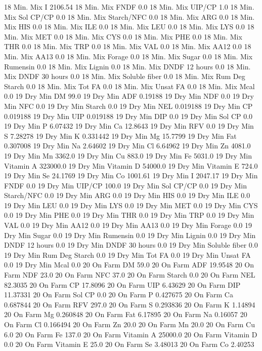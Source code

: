 \documentclass[letterpaper,10pt,english]{sphinxmanual}
\begin{document}
\begin{sphinxVerbatim}[commandchars=\\\{\},numbers=left,firstnumber=1,stepnumber=1]
18 Min. Mix I 2106.54
18 Min. Mix FNDF 0.0
18 Min. Mix UIP/CP 1.0
18 Min. Mix Sol CP/CP 0.0
18 Min. Mix Starch/NFC 0.0
18 Min. Mix ARG 0.0
18 Min. Mix HIS 0.0
18 Min. Mix ILE 0.0
18 Min. Mix LEU 0.0
18 Min. Mix LYS 0.0
18 Min. Mix MET 0.0
18 Min. Mix CYS 0.0
18 Min. Mix PHE 0.0
18 Min. Mix THR 0.0
18 Min. Mix TRP 0.0
18 Min. Mix VAL 0.0
18 Min. Mix AA\PYGZsh{}12 0.0
18 Min. Mix AA\PYGZsh{}13 0.0
18 Min. Mix \PYGZpc{} Forage 0.0
18 Min. Mix Sugar \PYGZpc{} 0.0
18 Min. Mix Rumensin 0.0
18 Min. Mix Lignin 0.0
18 Min. Mix DNDF 12 hours 0.0
18 Min. Mix DNDF 30 hours 0.0
18 Min. Mix Soluble fiber 0.0
18 Min. Mix Rum Deg Starch 0.0
18 Min. Mix Tot FA 0.0
18 Min. Mix Unsat FA 0.0
18 Min. Mix Mcal 0.0
19 Dry Min DM 99.0
19 Dry Min ADF 0.19188
19 Dry Min NDF 0.0
19 Dry Min NFC 0.0
19 Dry Min Starch 0.0
19 Dry Min NEL 0.019188
19 Dry Min CP 0.019188
19 Dry Min UIP 0.019188
19 Dry Min DIP 0.0
19 Dry Min Sol CP 0.0
19 Dry Min P 6.07432
19 Dry Min Ca 12.8643
19 Dry Min RFV 0.0
19 Dry Min S 7.28278
19 Dry Min K 0.331442
19 Dry Min Mg 15.7799
19 Dry Min Fat 0.307008
19 Dry Min Na 2.64602
19 Dry Min Cl 6.64962
19 Dry Min Zn 4081.0
19 Dry Min Mn 3362.0
19 Dry Min Cu 883.0
19 Dry Min Fe 5031.0
19 Dry Min Vitamin A 323000.0
19 Dry Min Vitamin D 54000.0
19 Dry Min Vitamin E 724.0
19 Dry Min Se 24.1769
19 Dry Min Co 1001.61
19 Dry Min I 2047.17
19 Dry Min FNDF 0.0
19 Dry Min UIP/CP 100.0
19 Dry Min Sol CP/CP 0.0
19 Dry Min Starch/NFC 0.0
19 Dry Min ARG 0.0
19 Dry Min HIS 0.0
19 Dry Min ILE 0.0
19 Dry Min LEU 0.0
19 Dry Min LYS 0.0
19 Dry Min MET 0.0
19 Dry Min CYS 0.0
19 Dry Min PHE 0.0
19 Dry Min THR 0.0
19 Dry Min TRP 0.0
19 Dry Min VAL 0.0
19 Dry Min AA\PYGZsh{}12 0.0
19 Dry Min AA\PYGZsh{}13 0.0
19 Dry Min \PYGZpc{} Forage 0.0
19 Dry Min Sugar \PYGZpc{} 0.0
19 Dry Min Rumensin 0.0
19 Dry Min Lignin 0.0
19 Dry Min DNDF 12 hours 0.0
19 Dry Min DNDF 30 hours 0.0
19 Dry Min Soluble fiber 0.0
19 Dry Min Rum Deg Starch 0.0
19 Dry Min Tot FA 0.0
19 Dry Min Unsat FA 0.0
19 Dry Min Mcal 0.0
20 On Farm DM 59.0
20 On Farm ADF 19.9548
20 On Farm NDF 23.0
20 On Farm NFC 37.0
20 On Farm Starch 0.0
20 On Farm NEL 82.3035
20 On Farm CP 17.8096
20 On Farm UIP 6.43629
20 On Farm DIP 11.37331
20 On Farm Sol CP 0.0
20 On Farm P 0.427675
20 On Farm Ca 0.687844
20 On Farm RFV 297.0
20 On Farm S 0.293836
20 On Farm K 1.14894
20 On Farm Mg 0.260848
20 On Farm Fat 6.17895
20 On Farm Na 0.16057
20 On Farm Cl 0.166494
20 On Farm Zn 20.0
20 On Farm Mn 20.0
20 On Farm Cu 6.0
20 On Farm Fe 137.0
20 On Farm Vitamin A 25000.0
20 On Farm Vitamin D 0.0
20 On Farm Vitamin E 25.0
20 On Farm Se 3.48013
20 On Farm Co 2.40253

\end{sphinxVerbatim}
\end{document}
